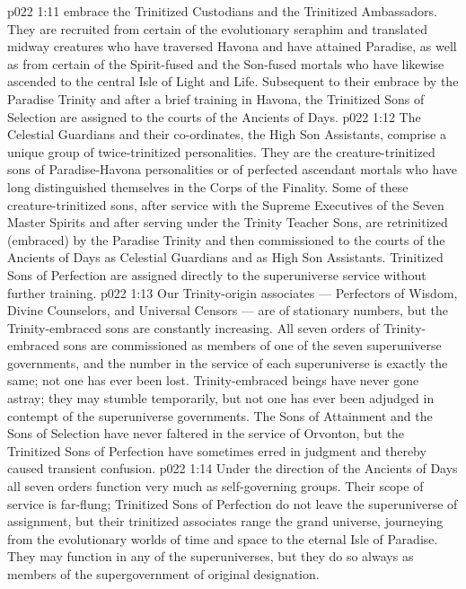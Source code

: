 \vs p022 1:11 \pc {} embrace the Trinitized Custodians and the Trinitized Ambassadors. They are recruited from certain of the evolutionary seraphim and translated midway creatures who have traversed Havona and have attained Paradise, as well as from certain of the Spirit\hyp{}fused and the Son\hyp{}fused mortals who have likewise ascended to the central Isle of Light and Life. Subsequent to their embrace by the Paradise Trinity and after a brief training in Havona, the Trinitized Sons of Selection are assigned to the courts of the Ancients of Days.
\vs p022 1:12 \pc {} The Celestial Guardians and their co\hyp{}ordinates, the High Son Assistants, comprise a unique group of twice\hyp{}trinitized personalities. They are the creature\hyp{}trinitized sons of Paradise\hyp{}Havona personalities or of perfected ascendant mortals who have long distinguished themselves in the Corps of the Finality. Some of these creature\hyp{}trinitized sons, after service with the Supreme Executives of the Seven Master Spirits and after serving under the Trinity Teacher Sons, are retrinitized (embraced) by the Paradise Trinity and then commissioned to the courts of the Ancients of Days as Celestial Guardians and as High Son Assistants. Trinitized Sons of Perfection are assigned directly to the superuniverse service without further training.
\vs p022 1:13 \pc Our Trinity\hyp{}origin associates --- Perfectors of Wisdom, Divine Counselors, and Universal Censors --- are of stationary numbers, but the Trinity\hyp{}embraced sons are constantly increasing. All seven orders of Trinity\hyp{}embraced sons are commissioned as members of one of the seven superuniverse governments, and the number in the service of each superuniverse is exactly the same; not one has ever been lost. Trinity\hyp{}embraced beings have never gone astray; they may stumble temporarily, but not one has ever been adjudged in contempt of the superuniverse governments. The Sons of Attainment and the Sons of Selection have never faltered in the service of Orvonton, but the Trinitized Sons of Perfection have sometimes erred in judgment and thereby caused transient confusion.
\vs p022 1:14 Under the direction of the Ancients of Days all seven orders function very much as self\hyp{}governing groups. Their scope of service is far\hyp{}flung; Trinitized Sons of Perfection do not leave the superuniverse of assignment, but their trinitized associates range the grand universe, journeying from the evolutionary worlds of time and space to the eternal Isle of Paradise. They may function in any of the superuniverses, but they do so always as members of the supergovernment of original designation.
